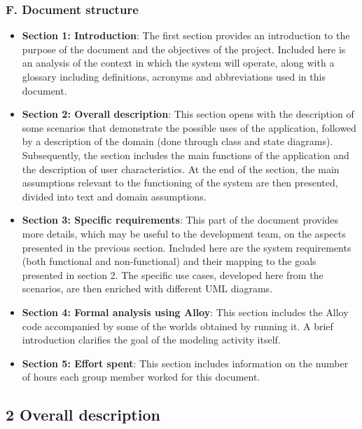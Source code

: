 \hypertarget{f.-document-structure}{%
\subsubsection{F. Document structure}\label{f.-document-structure}}

\begin{itemize}
\tightlist
\item
  \textbf{Section 1: Introduction}: The first section provides an
  introduction to the purpose of the document and the objectives of the
  project. Included here is an analysis of the context in which the
  system will operate, along with a glossary including definitions,
  acronyms and abbreviations used in this document.
\item
  \textbf{Section 2: Overall description}: This section opens with the
  description of some scenarios that demonstrate the possible uses of
  the application, followed by a description of the domain (done through
  class and state diagrams). Subsequently, the section includes the main
  functions of the application and the description of user
  characteristics. At the end of the section, the main assumptions
  relevant to the functioning of the system are then presented, divided
  into text and domain assumptions.
\item
  \textbf{Section 3: Specific requirements}: This part of the document
  provides more details, which may be useful to the development team, on
  the aspects presented in the previous section. Included here are the
  system requirements (both functional and non-functional) and their
  mapping to the goals presented in section 2. The specific use cases,
  developed here from the scenarios, are then enriched with different
  UML diagrams.
\item
  \textbf{Section 4: Formal analysis using Alloy}: This section includes
  the Alloy code accompanied by some of the worlds obtained by running
  it. A brief introduction clarifies the goal of the modeling activity
  itself.
\item
  \textbf{Section 5: Effort spent}: This section includes information on
  the number of hours each group member worked for this document.
\end{itemize}

\hypertarget{overall-description}{%
\subsection{2 Overall description}\label{overall-description}}

